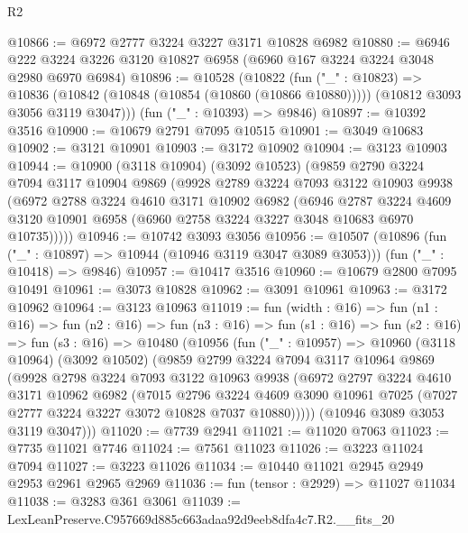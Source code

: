 \begin{lexlean}{R2}
\begin{coremodule}
@10866 := @6972 @2777 @3224 @3227 @3171 @10828 @6982
@10880 := @6946 @222 @3224 @3226 @3120 @10827 @6958 (@6960 @167 @3224 @3224 @3048 @2980 @6970 @6984)
@10896 := @10528
    (@10822
      (fun ("_" : @10823) =>
      @10836 (@10842 (@10848 (@10854 (@10860 (@10866 @10880))))) (@10812 @3093 @3056 @3119 @3047)))
    (fun ("_" : @10393) => @9846)
@10897 := @10392 @3516
@10900 := @10679 @2791 @7095 @10515
@10901 := @3049 @10683
@10902 := @3121 @10901
@10903 := @3172 @10902
@10904 := @3123 @10903
@10944 := @10900
    (@3118 @10904)
    (@3092 @10523)
    (@9859
      @2790
      @3224
      @7094
      @3117
      @10904
      @9869
      (@9928
        @2789
        @3224
        @7093
        @3122
        @10903
        @9938
        (@6972
          @2788
          @3224
          @4610
          @3171
          @10902
          @6982
          (@6946
            @2787
            @3224
            @4609
            @3120
            @10901
            @6958
            (@6960 @2758 @3224 @3227 @3048 @10683 @6970 @10735)))))
@10946 := @10742 @3093 @3056
@10956 := @10507
    (@10896 (fun ("_" : @10897) => @10944 (@10946 @3119 @3047 @3089 @3053)))
    (fun ("_" : @10418) => @9846)
@10957 := @10417 @3516
@10960 := @10679 @2800 @7095 @10491
@10961 := @3073 @10828
@10962 := @3091 @10961
@10963 := @3172 @10962
@10964 := @3123 @10963
@11019 := fun (width : @16) =>
  fun (n1 : @16) =>
  fun (n2 : @16) =>
  fun (n3 : @16) =>
  fun (s1 : @16) =>
  fun (s2 : @16) =>
  fun (s3 : @16) =>
  @10480
    (@10956
      (fun ("_" : @10957) =>
      @10960
        (@3118 @10964)
        (@3092 @10502)
        (@9859
          @2799
          @3224
          @7094
          @3117
          @10964
          @9869
          (@9928
            @2798
            @3224
            @7093
            @3122
            @10963
            @9938
            (@6972
              @2797
              @3224
              @4610
              @3171
              @10962
              @6982
              (@7015
                @2796
                @3224
                @4609
                @3090
                @10961
                @7025
                (@7027 @2777 @3224 @3227 @3072 @10828 @7037 @10880)))))
        (@10946 @3089 @3053 @3119 @3047)))
@11020 := @7739 @2941
@11021 := @11020 @7063
@11023 := @7735 @11021 @7746
@11024 := @7561 @11023
@11026 := @3223 @11024 @7094
@11027 := @3223 @11026
@11034 := @10440 @11021 @2945 @2949 @2953 @2961 @2965 @2969
@11036 := fun (tensor : @2929) => @11027 @11034
@11038 := @3283 @361 @3061
@11039 := LexLeanPreserve.C957669d885c663adaa92d9eeb8dfa4c7.R2.__fits_20

\end{coremodule}
\end{lexlean}
